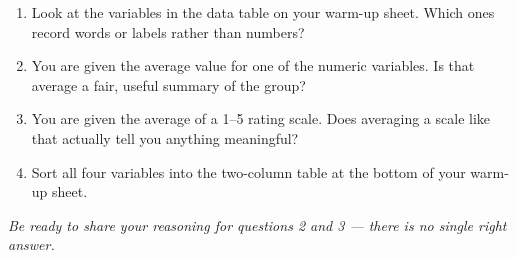 \documentclass[aspectratio=169, 11pt]{beamer}
\begin{document}
{
\begin{frame}[t, plain]
  \vspace{1.1cm}\par
  \hspace{0.55cm}%
  \begin{minipage}{0.9\textwidth}
    \vspace{0.4em}
    \small

    \begin{enumerate}
      \setlength{\itemsep}{0.7em}\setlength{\topsep}{0em}
      \item Look at the variables in the data table on your warm-up sheet.
            Which ones record words or labels rather than numbers?
      \item You are given the average value for one of the numeric variables.
            Is that average a fair, useful summary of the group?
      \item You are given the average of a 1--5 rating scale.
            Does averaging a scale like that actually tell you anything meaningful?
      \item Sort all four variables into the two-column table at the bottom
            of your warm-up sheet.
    \end{enumerate}

    \vspace{0.6cm}
    {\color{navy}\itshape\small
      Be ready to share your reasoning for questions 2 and 3 --- there is
      no single right answer.}
  \end{minipage}
\end{frame}
}
\end{document}
